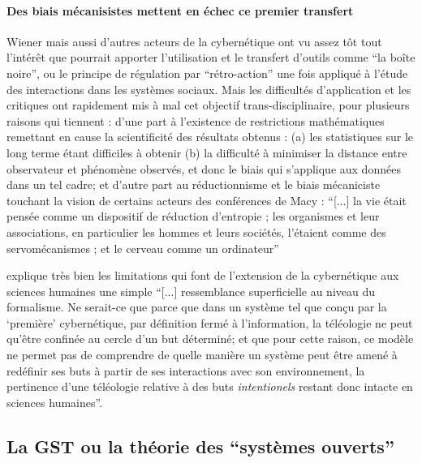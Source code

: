 \paragraph{Des biais mécanisistes mettent en échec ce premier transfert}

Wiener mais aussi d'autres acteurs de la cybernétique ont vu assez tôt tout l'intérêt que pourrait apporter l'utilisation et le transfert d'outils comme \enquote{la boîte noire}, ou le principe de régulation par \enquote{rétro-action} une fois appliqué à l'étude des interactions dans les systèmes sociaux. Mais les difficultés d'application et les critiques ont rapidement mis à mal cet objectif trans-disciplinaire, pour plusieurs raisons qui tiennent : d'une part à l'existence de restrictions mathématiques remettant en cause la scientificité des résultats obtenus : (a) les statistiques sur le long terme étant difficiles à obtenir (b) la difficulté à minimiser la distance entre observateur et phénomène observés, et donc le biais qui s'applique aux données dans un tel cadre; et d'autre part au réductionnisme et le biais mécaniciste touchant la vision de certains acteurs des conférences de Macy  : \enquote{[...] la vie était pensée comme un dispositif de réduction d'entropie ; les organismes et leur associations, en particulier les hommes et leurs sociétés, l'étaient comme des servomécanismes ; et le cerveau comme un ordinateur} \autocite[784]{Pouvreau2013}

\autocite[782]{Pouvreau2013} explique très bien les limitations qui font  de l'extension de la cybernétique aux sciences humaines une simple \enquote{[...] ressemblance superficielle au niveau du formalisme. Ne serait-ce que parce que dans un système tel que conçu par la \enquote{première} cybernétique, par définition fermé à l'information, la téléologie ne peut qu'être confinée au cercle d'un but déterminé; et que pour cette raison, ce modèle ne permet pas de comprendre de quelle manière un système peut être amené à redéfinir ses buts à partir de ses interactions avec son environnement, la pertinence d'une téléologie relative à des buts \textit{intentionels} restant donc intacte en sciences humaines}.

\subsection{La GST ou la théorie des \enquote{systèmes ouverts}}
\label{subsec:gst}

